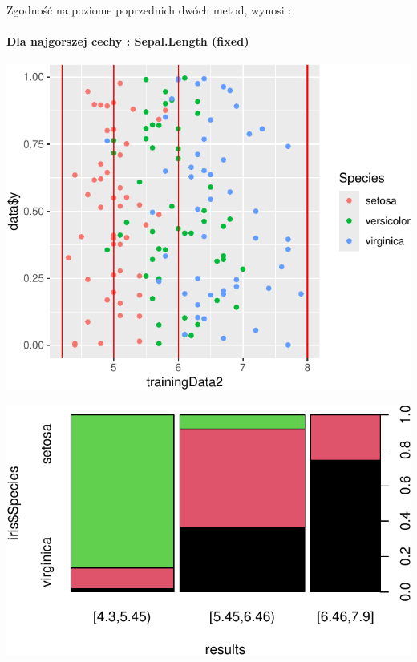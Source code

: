 \documentclass[
  12pt,
]{article}
\begin{document}
Zgodność na poziome poprzednich dwóch metod, wynosi :

\paragraph{Dla najgorszej cechy : Sepal.Length
(fixed)}\label{dla-najgorszej-cechy-sepal.length-fixed}

\begin{center}\includegraphics{Sprawozdanie2_files/figure-latex/givenRanges_najg-1} \end{center}

\begin{center}\includegraphics{Sprawozdanie2_files/figure-latex/tabela_kondygnacji_4_najg-1} \end{center}
\end{document}
